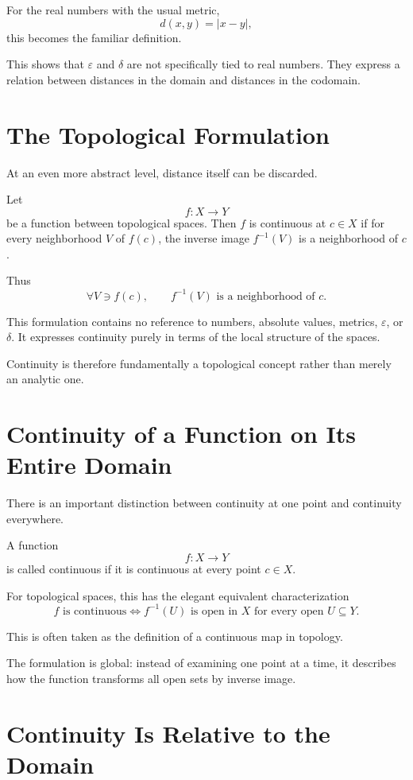 \documentclass{essay}
\begin{document}
For the real numbers with the usual metric,
\[
d(x,y)=|x-y|,
\]
this becomes the familiar definition.

This shows that $\varepsilon$ and $\delta$ are not specifically tied to real numbers. They express a relation between distances in the domain and distances in the codomain.

\section{The Topological Formulation}

At an even more abstract level, distance itself can be discarded.

Let
\[
f:X\to Y
\]
be a function between topological spaces. Then $f$ is continuous at $c\in X$ if for every neighborhood $V$ of $f(c)$, the inverse image $f^{-1}(V)$ is a neighborhood of $c$.

Thus
\[
\boxed{
\forall V\ni f(c),
\qquad
f^{-1}(V)\text{ is a neighborhood of }c.
}
\]

This formulation contains no reference to numbers, absolute values, metrics, $\varepsilon$, or $\delta$. It expresses continuity purely in terms of the local structure of the spaces.

Continuity is therefore fundamentally a topological concept rather than merely an analytic one.

\section{Continuity of a Function on Its Entire Domain}

There is an important distinction between continuity at one point and continuity everywhere.

A function
\[
f:X\to Y
\]
is called continuous if it is continuous at every point $c\in X$.

For topological spaces, this has the elegant equivalent characterization
\[
\boxed{
f\text{ is continuous}
\iff
f^{-1}(U)\text{ is open in }X
\text{ for every open }U\subseteq Y.
}
\]

This is often taken as the definition of a continuous map in topology.

The formulation is global: instead of examining one point at a time, it describes how the function transforms all open sets by inverse image.

\section{Continuity Is Relative to the Domain}
\end{document}
